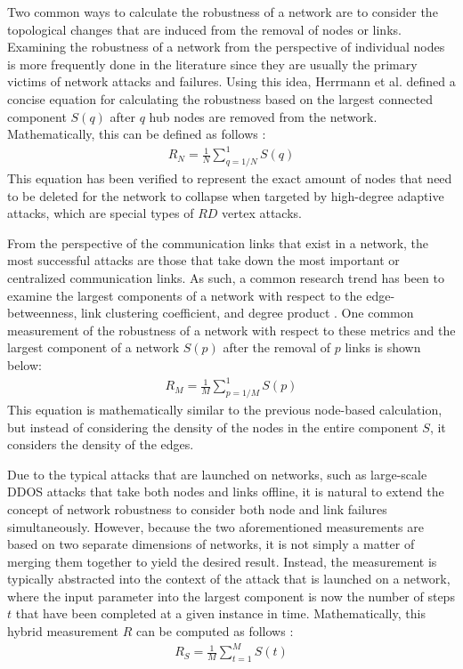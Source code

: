 \documentclass[doc]{apa}%
\begin{document}
Two common ways to calculate the robustness of a network are to consider the topological changes that are induced from the removal of nodes or links. Examining the robustness of a network from the perspective of individual nodes is more frequently done in the literature since they are usually the primary victims of network attacks and failures. Using this idea, Herrmann et al. defined a concise equation for calculating the robustness based on the largest connected component $S(q)$ after $q$ hub nodes are removed from the network. Mathematically, this can be defined as follows \cite{Onion}:
\begin{eqnarray}
R_{N} = \frac{1}{N}\sum_{q=1/N}^{1}S(q)
\end{eqnarray}
This equation has been verified to represent the exact amount of nodes that need to be deleted for the network to collapse when targeted by high-degree adaptive attacks, which are special types of $RD$ vertex attacks. 


From the perspective of the communication links that exist in a network, the most successful attacks are those that take down the most important or centralized communication links. As such, a common research trend has been to examine the largest components of a network with respect to the edge-betweenness, link clustering coefficient, and degree product \cite{NRMalicious}. One common measurement of the robustness of a network with respect to these metrics and the largest component of a network $S(p)$ after the removal of $p$ links is shown below:
\begin{eqnarray}
R_M = \frac{1}{M}\sum_{p = 1/M}^{1}S(p)
\end{eqnarray}
This equation is mathematically similar to the previous node-based calculation, but instead of considering the density of the nodes in the entire component $S$, it considers the density of the edges. 

Due to the typical attacks that are launched on networks, such as large-scale DDOS attacks that take both nodes and links offline, it is natural to extend the concept of network robustness to consider both node and link failures simultaneously. However, because the two aforementioned measurements are based on two separate dimensions of networks, it is not simply a matter of merging them together to yield the desired result. Instead, the measurement is typically abstracted into the context of the attack that is launched on a network, where the input parameter into the largest component is now the number of steps $t$ that have been completed at a given instance in time. Mathematically, this hybrid measurement $R$ can be computed as follows \cite{NRMalicious}:
\begin{eqnarray}
R_S = \frac{1}{M}\sum_{t  = 1}^{M}S(t)
\end{eqnarray}
\end{document}
